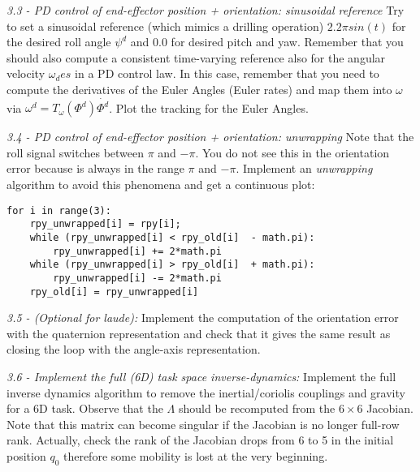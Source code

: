 \documentclass[11pt]{article}
\begin{document}
\textit{3.3 - PD control of end-effector position + orientation: sinusoidal reference}
Try to set a sinusoidal reference (which mimics a drilling operation)  $ 2.2 \pi sin(t)$ for the desired roll angle $\psi^d$ and 0.0 for desired pitch and yaw. Remember that you should also compute a consistent time-varying reference also for the angular velocity $\omega_des$ in a PD control law. In this case, remember that you need to compute the derivatives of the Euler Angles (Euler rates) and map  them into $\omega$ via  $\omega^d = T_{\omega}(\Phi^d)\dot{\Phi^d}$. 
Plot the tracking for the Euler Angles.


\textit{3.4 - PD control of end-effector position + orientation: unwrapping}
Note that the roll signal switches between $\pi$ and $-\pi$. You do not see this in the orientation error because is always in the range $\pi$ and $-\pi$. Implement an \textit{unwrapping} algorithm to avoid this phenomena and get a continuous plot:

\begin{verbatim}
for i in range(3):
    rpy_unwrapped[i] = rpy[i];
    while (rpy_unwrapped[i] < rpy_old[i]  - math.pi):
        rpy_unwrapped[i] += 2*math.pi
    while (rpy_unwrapped[i] > rpy_old[i]  + math.pi):  
        rpy_unwrapped[i] -= 2*math.pi
    rpy_old[i] = rpy_unwrapped[i] 	
\end{verbatim}



\quad

\noindent
\textit{3.5 - (Optional for laude):}
Implement the computation of the orientation error with the 
quaternion representation and check that it gives the same result as closing the loop with the angle-axis representation. 

\quad
 
\noindent
\textit{3.6 - Implement the full (6D) task space inverse-dynamics:}
Implement the full inverse dynamics algorithm to remove the inertial/coriolis couplings and gravity for a 6D task.
Observe that the $\Lambda$ should be recomputed from the $6\times6$ Jacobian. Note that this matrix 
can become singular if the Jacobian is no longer full-row rank. 
Actually, check the rank of the Jacobian drops from 6 to 5 in the initial position $q_0$ therefore some mobility is lost 
at the very beginning.
\end{document}
